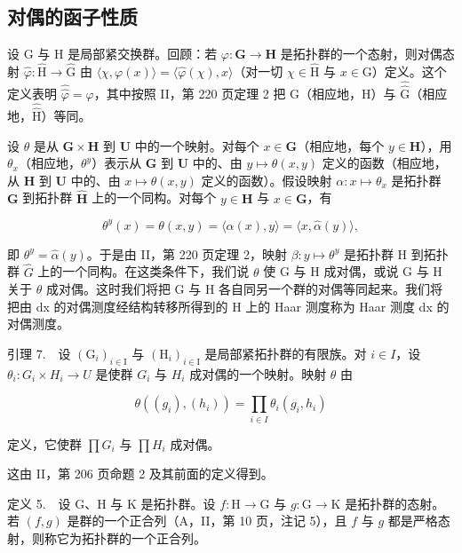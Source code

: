 \subsection{对偶的函子性质}

设 G 与 H 是局部紧交换群。回顾：若 \(\varphi\colon\mathbf{G}\to\mathbf{H}\) 是拓扑群的一个态射，则对偶态射 \(\widehat{\varphi}\colon\widehat{\mathrm{H}}\to\widehat{\mathrm{G}}\) 由 \(\langle\chi,\varphi(x)\rangle=\langle\widehat{\varphi}(\chi),x\rangle\)（对一切 \(\chi\in\widehat{\mathrm{H}}\) 与 \(x\in\mathrm{G}\)）定义。这个定义表明 \(\widehat{\widehat{\varphi}}=\varphi\)，其中按照 II，第 220 页定理 2 把 G（相应地，H）与 \(\widehat{\widehat{\mathrm{G}}}\)（相应地，\(\widehat{\widehat{\mathrm{H}}}\)）等同。

设 \(\theta\) 是从 \(\mathbf{G} \times \mathbf{H}\) 到 \(\mathbf{U}\) 中的一个映射。对每个 \(x \in \mathbf{G}\)（相应地，每个 \(y \in \mathbf{H}\)），用 \(\theta_x\)（相应地，\(\theta^y\)）表示从 \(\mathbf{G}\) 到 \(\mathbf{U}\) 中的、由 \(y \mapsto \theta(x, y)\) 定义的函数（相应地，从 \(\mathbf{H}\) 到 \(\mathbf{U}\) 中的、由 \(x \mapsto \theta(x, y)\) 定义的函数）。假设映射 \(\alpha: x \mapsto \theta_x\) 是拓扑群 \(\mathbf{G}\) 到拓扑群 \(\widehat{\mathbf{H}}\) 上的一个同构。对每个 \(y \in \mathbf{H}\) 与 \(x \in \mathbf{G}\)，有

\[
\theta^ {y} (x) = \theta (x, y) = \langle \alpha (x), y \rangle = \langle x, \widehat {\alpha} (y) \rangle ,
\]

即 \(\theta^{y} = \widehat{\alpha}(y)\)。于是由 II，第 220 页定理 2，映射 \(\beta: y \mapsto \theta^{y}\) 是拓扑群 H 到拓扑群 \(\widehat{G}\) 上的一个同构。在这类条件下，我们说 \(\theta\) 使 G 与 H 成对偶，或说 G 与 H 关于 \(\theta\) 成对偶。这时我们将把 G 与 H 各自同另一个群的对偶等同起来。我们将把由 dx 的对偶测度经结构转移所得到的 H 上的 Haar 测度称为 Haar 测度 dx 的对偶测度。

引理 7.　设 \((\mathrm{G}_{i})_{i\in\mathrm{I}}\) 与 \((\mathrm{H}_{i})_{i\in\mathrm{I}}\) 是局部紧拓扑群的有限族。对 \(i\in I\)，设 \(\theta_{i}\colon G_{i}\times H_{i}\to U\) 是使群 \(G_{i}\) 与 \(H_{i}\) 成对偶的一个映射。映射 \(\theta\) 由

\[
\theta ((g _ {i}), (h _ {i})) = \prod_ {i \in I} \theta_ {i} (g _ {i}, h _ {i})
\]

定义，它使群 \(\prod G_{i}\) 与 \(\prod H_{i}\) 成对偶。

这由 II，第 206 页命题 2 及其前面的定义得到。

定义 5.　设 G、H 与 K 是拓扑群。设 \(f: \mathrm{H} \to \mathrm{G}\) 与 \(g: \mathrm{G} \to \mathrm{K}\) 是拓扑群的态射。若 \((f, g)\) 是群的一个正合列（A，II，第 10 页，注记 5），且 \(f\) 与 \(g\) 都是严格态射，则称它为拓扑群的一个正合列。

